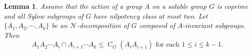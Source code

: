 \documentclass[12pt,a4paper]{article}
\DeclareMathOperator{\C}{C}
\DeclareMathOperator{\Q}{Q}
\newtheorem{lemma}[theorem]{Lemma}
\theoremstyle{definition}
\begin{document}
\begin{lemma}\label{lem-nilpotency-class-2}
Assume that the action of a group  $A$ on a soluble group $G$ is coprime and all Sylow subgroups of $G$ have nilpotency class at most two. Let $\{A_1,A_2,\cdots,A_k\}$ be an $\mathcal{N}$-decomposition of $G$ composed of $A$-invariant subgroups. Then
$$A_1A_2\cdots A_i \cap A_{i+1}\cdots A_k \leq \C_G(A_iA_{i+1}) \text { for each } 1 \leq i \leq k-1.$$
\end{lemma}
\end{document}
